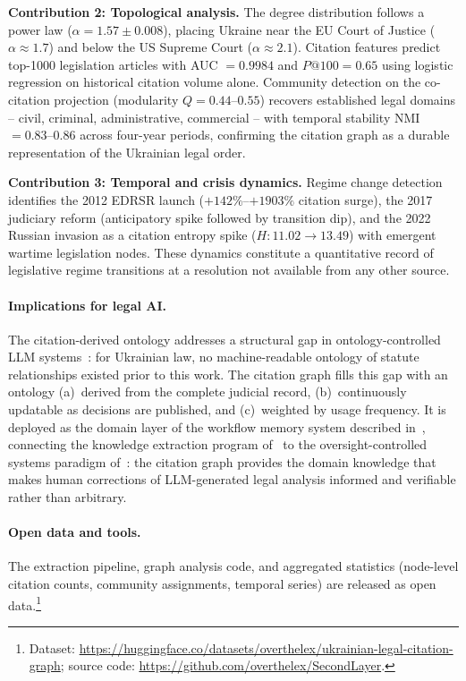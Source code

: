 \documentclass[11pt]{article}
\begin{document}
\textbf{Contribution 2: Topological analysis.}
The degree distribution follows a power law ($\alpha = 1.57 \pm 0.008$), placing Ukraine near the EU Court of Justice ($\alpha \approx 1.7$) and below the US Supreme Court ($\alpha \approx 2.1$).
Citation features predict top-1000 legislation articles with AUC $= 0.9984$ and $P@100 = 0.65$ using logistic regression on historical citation volume alone.
Community detection on the co-citation projection (modularity $Q = 0.44$--$0.55$) recovers established legal domains -- civil, criminal, administrative, commercial -- with temporal stability NMI $= 0.83$--$0.86$ across four-year periods, confirming the citation graph as a durable representation of the Ukrainian legal order.

\textbf{Contribution 3: Temporal and crisis dynamics.}
Regime change detection identifies the 2012 EDRSR launch ($+142\%$--$+1903\%$ citation surge), the 2017 judiciary reform (anticipatory spike followed by transition dip), and the 2022 Russian invasion as a citation entropy spike ($H: 11.02 \to 13.49$) with emergent wartime legislation nodes.
These dynamics constitute a quantitative record of legislative regime transitions at a resolution not available from any other source.

\paragraph{Implications for legal AI.}
The citation-derived ontology addresses a structural gap in ontology-controlled LLM systems~\citep{palagin2023ontochatgpt}: for Ukrainian law, no machine-readable ontology of statute relationships existed prior to this work.
The citation graph fills this gap with an ontology (a)~derived from the complete judicial record, (b)~continuously updatable as decisions are published, and (c)~weighted by usage frequency.
It is deployed as the domain layer of the workflow memory system described in~\citet{ovcharov2026workflowmemory}, connecting the knowledge extraction program of~\citet{palagin2012knowledge} to the oversight-controlled systems paradigm of~\citet{ovcharov2026bridge}: the citation graph provides the domain knowledge that makes human corrections of LLM-generated legal analysis informed and verifiable rather than arbitrary.

\paragraph{Open data and tools.}
The extraction pipeline, graph analysis code, and aggregated statistics (node-level citation counts, community assignments, temporal series) are released as open data.\footnote{Dataset: \url{https://huggingface.co/datasets/overthelex/ukrainian-legal-citation-graph}; source code: \url{https://github.com/overthelex/SecondLayer}.}
\end{document}
